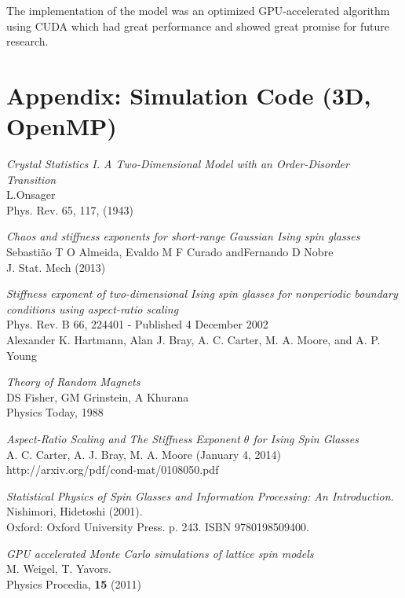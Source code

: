 \documentclass[paper=a4, fontsize=11pt]{scrartcl} %
\numberwithin{equation}{section} %
\numberwithin{figure}{section} %
\numberwithin{table}{section} %
\begin{document}
The implementation of the model was an optimized GPU-accelerated algorithm using CUDA which had great performance and showed great promise for future research.

\pagebreak
\section*{Appendix: Simulation Code (3D, OpenMP)}


\pagebreak

\begin{thebibliography}{100}

\textit{Crystal Statistics I. A Two-Dimensional Model with an Order-Disorder Transition} \\
L.Onsager \\
Phys. Rev. 65, 117, (1943)

\textit{Chaos and stiffness exponents for short-range Gaussian Ising spin glasses} \\
Sebasti\~{a}o T O Almeida, Evaldo M F Curado andFernando D Nobre \\
J. Stat. Mech (2013)

\textit{Stiffness exponent of two-dimensional Ising spin glasses for nonperiodic boundary conditions using aspect-ratio scaling} \\
Phys. Rev. B 66, 224401 - Published 4 December 2002 \\
Alexander K. Hartmann, Alan J. Bray, A. C. Carter, M. A. Moore, and A. P. Young

\textit{Theory of Random Magnets} \\
DS Fisher, GM Grinstein, A Khurana \\
Physics Today, 1988 

\textit{Aspect-Ratio Scaling and The Stiffness Exponent $\theta$ for Ising Spin Glasses} \\
A. C. Carter, A. J. Bray, M. A. Moore (January 4, 2014) \\
http://arxiv.org/pdf/cond-mat/0108050.pdf

\textit{Statistical Physics of Spin Glasses and Information Processing: An Introduction.} \\
Nishimori, Hidetoshi (2001). \\
Oxford: Oxford University Press. p. 243. ISBN 9780198509400.

\textit{GPU accelerated Monte Carlo simulations of lattice spin models} \\
M. Weigel, T. Yavors. \\
Physics Procedia, \textbf{15} (2011)


\end{thebibliography}
\end{document}
